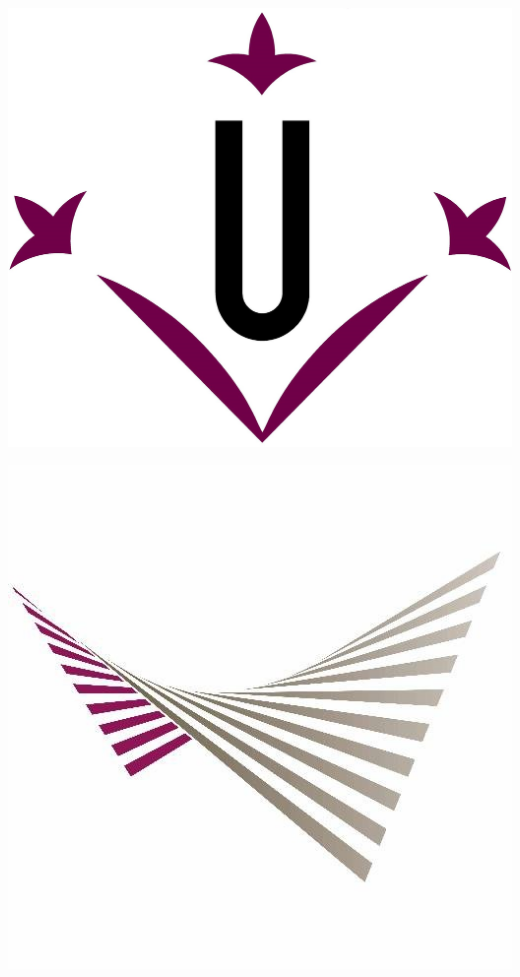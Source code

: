 \documentclass[10pt]{article}
\begin{document}
\begin{center}                                                                      %
\newcommand{\HRule}{\rule{\linewidth}{0.5mm}}                                   %
\begin{minipage}{0.48\textwidth} \begin{flushleft}
\includegraphics[scale = 0.23]{Images/logo_udl.jpg}
\end{flushleft}\end{minipage}
\begin{minipage}{0.48\textwidth} \begin{flushright}
\includegraphics[scale = 0.25]{Images/logo_eps.jpg}

\end{flushright}
\end{minipage}
\end{center}
\end{document}
